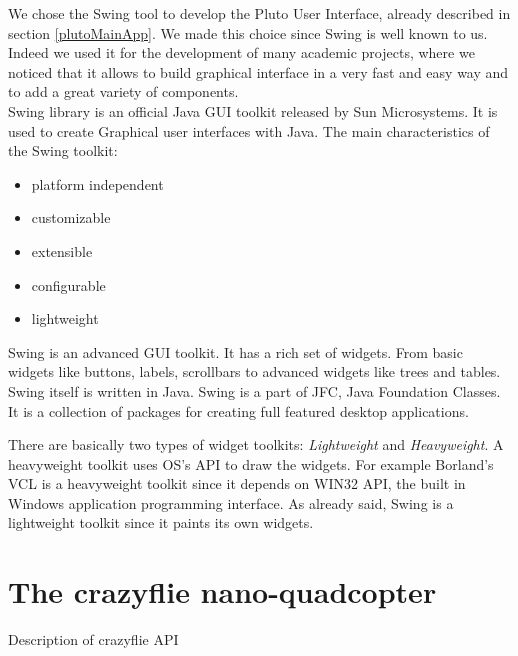 We chose the Swing tool to develop the Pluto User Interface, already described in section \ref{plutoMainApp}.
We made this choice since Swing is well known to us.
Indeed we used it for the development of many academic projects, where we noticed that it allows to build graphical interface in a very fast and easy way and to add a great variety of components.
\\

Swing library is an official Java GUI toolkit released by Sun Microsystems. It is used to create Graphical user interfaces with Java.
The main characteristics of the Swing toolkit:
\begin{itemize}
\item platform independent
\item customizable
\item extensible
\item configurable
\item lightweight
\end{itemize}

Swing is an advanced GUI toolkit. It has a rich set of widgets. From basic widgets like buttons, labels, scrollbars to advanced widgets like trees and tables. Swing itself is written in Java.
Swing is a part of JFC, Java Foundation Classes. It is a collection of packages for creating full featured desktop applications.

There are basically two types of widget toolkits: \textit{Lightweight} and \textit{Heavyweight}.
A heavyweight toolkit uses OS's API to draw the widgets. For example Borland's VCL is a heavyweight toolkit since it depends on WIN32 API, the built in Windows application programming interface.
As already said, Swing is a lightweight toolkit since it paints its own widgets.

\section{The crazyflie nano-quadcopter}\label{crazyflie}

Description of crazyflie API 

